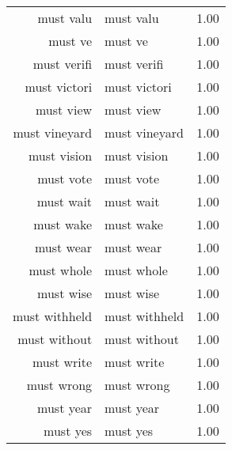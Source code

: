 \begin{table}[ht]
\begin{tabular}{rlr}
  must valu & must valu & 1.00 \\ 
  must ve & must ve & 1.00 \\ 
  must verifi & must verifi & 1.00 \\ 
  must victori & must victori & 1.00 \\ 
  must view & must view & 1.00 \\ 
  must vineyard & must vineyard & 1.00 \\ 
  must vision & must vision & 1.00 \\ 
  must vote & must vote & 1.00 \\ 
  must wait & must wait & 1.00 \\ 
  must wake & must wake & 1.00 \\ 
  must wear & must wear & 1.00 \\ 
  must whole & must whole & 1.00 \\ 
  must wise & must wise & 1.00 \\ 
  must withheld & must withheld & 1.00 \\ 
  must without & must without & 1.00 \\ 
  must write & must write & 1.00 \\ 
  must wrong & must wrong & 1.00 \\ 
  must year & must year & 1.00 \\ 
  must yes & must yes & 1.00 \\ 
   \hline
\end{tabular}
\end{table}
